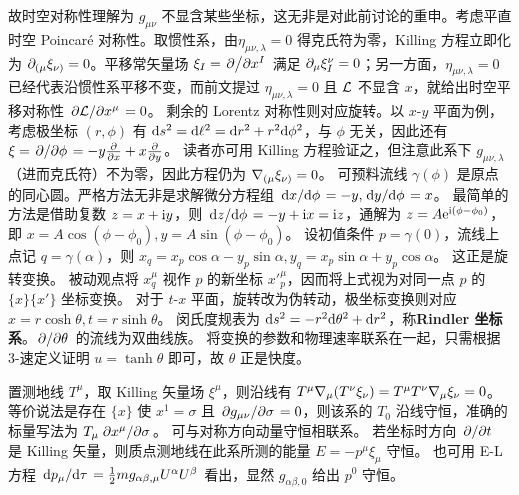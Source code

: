 故时空对称性理解为 $g_{\mu\nu}$ 不显含某些坐标，这无非是对此前讨论的重申。考虑平直时空 Poincaré 对称性。取惯性系，由$\eta_{\mu\nu,\lambda}=0$ 得克氏符为零，Killing 方程立即化为 $\partial_{(\mu}\xi_{\nu)}=0$。平移常矢量场 $\xi_I=\pdv*{x^I}$ 满足 $\partial_\mu\xi^\nu_I=0$；另一方面，$\eta_{\mu\nu,\lambda}=0$ 已经代表沿惯性系平移不变，而前文提过 $\eta_{\mu\nu,\lambda}=0$ 且 $\mathcal{L}$ 不显含 $x$，就给出时空平移对称性 $\pdv*{\mathcal{L}}{x^\mu}=0$。
剩余的 Lorentz 对称性则对应旋转。以 $x$-$y$ 平面为例，考虑极坐标 $(r,\phi)$ 有 $\dd s^2=\dd \ell^2=\dd r^2+r^2\dd\phi^2$，与 $\phi$ 无关，因此还有 $\xi=\pdv*{\phi}=-y\pdv{x}+x\pdv{y}$。
读者亦可用 Killing 方程验证之，但注意此系下 $g_{\mu\nu,\lambda}$（进而克氏符）不为零，因此方程仍为 $\nabla_{(\mu}\xi_{\nu)}=0$。
可预料流线 $\gamma(\phi)$ 是原点的同心圆。严格方法无非是求解微分方程组 $\dv*{x}{\phi}=-y,\dv*{y}{\phi}=x$。
最简单的方法是借助复数 $z=x+\mathrm{i} y$，则 $\dv*{z}{\phi}=-y+\mathrm{i} x=\mathrm{i} z$，通解为 $z=A\mathrm{e}^{\mathrm{i}(\phi-\phi_0)}$，即 $x=A\cos(\phi-\phi_0), y=A\sin(\phi-\phi_0)$。
设初值条件 $p=\gamma(0)$，流线上点记 $q=\gamma(\alpha)$，则
$x_q=x_p\cos\alpha-y_p\sin\alpha, y_q=x_p\sin\alpha+y_p\cos\alpha$。
这正是旋转变换。
被动观点将 $x_q^\mu$ 视作 $p$ 的新坐标 $x'^\mu_p$，因而将上式视为对同一点 $p$ 的 $\{x\}\{x'\}$ 坐标变换。
对于 $t$-$x$ 平面，旋转改为伪转动，极坐标变换则对应 $x=r\cosh\theta, t=r\sinh\theta$。
闵氏度规表为 $\dd s^2=-r^2\dd\theta^2+\dd r^2$，称\textbf{Rindler 坐标系}。$\pdv*{\theta}$ 的流线为双曲线族。
将变换的参数和物理速率联系在一起，只需根据 3-速定义证明 $u=\tanh\theta$ 即可，故 $\theta$ 正是快度。

置测地线 $T^\mu$，取 Killing 矢量场 $\xi^\mu$，则沿线有 $T^\mu\nabla_\mu(T^\nu\xi_\nu)=T^\mu T^\nu\nabla_\mu\xi_\nu=0$。等价说法是存在 $\{x\}$ 使 $x^1=\sigma$ 且 $\pdv*{g_{\mu\nu}}{\sigma}=0$，则该系的 $T_{0}$ 沿线守恒，准确的标量写法为 $T_\mu\pdv*{x^\mu}{\sigma}$。
可与对称方向动量守恒相联系。
若坐标时方向 $\pdv*{t}$ 是 Killing 矢量，则质点测地线在此系所测的能量 $E=-p^\mu\xi_\mu$ 守恒。
也可用 E-L 方程 $\dv*{p_\mu}{\tau}=\frac 12 mg_{\alpha\beta,\mu} U^\alpha U^\beta$
看出，显然 $g_{\alpha\beta,0}$ 给出 $p^0$ 守恒。

